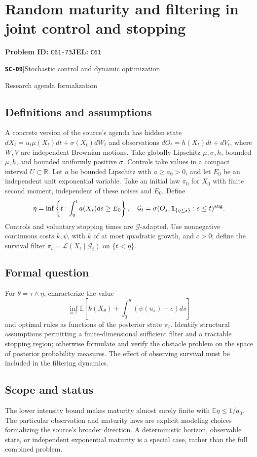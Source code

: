 \documentclass[11pt,a4paper]{article}
\newcommand{\R}{\mathbb R}
\newcommand{\E}{\mathbb E}
\newcommand{\ind}{\mathbf 1}
\newcommand{\entrymeta}[3]{{\sffamily\small\color{muted}\textbf{\texttt{#1}}\quad|\quad #2\par #3\par}}
\begin{document}
\section*{Random maturity and filtering in joint control and stopping}
\textbf{Problem ID:} \texttt{C61-73}\quad \textbf{JEL:} \texttt{C61}\par
\label{problem:OP-0570}
\label{beyond:SC-09}
\entrymeta{SC-09}{Stochastic control and dynamic optimization}{Research agenda formalization}
\subsection*{Definitions and assumptions}
A concrete version of the source's agenda has hidden state
$dX_t=u_t\mu(X_t)dt+\sigma(X_t)dW_t$ and observations
$dO_t=h(X_t)dt+dV_t$, where $W,V$ are independent Brownian motions.
Take globally Lipschitz $\mu,\sigma,h$, bounded $\mu,h$, and bounded
uniformly positive $\sigma$. Controls take values in a compact interval
$U\subset\R$. Let $a$ be bounded Lipschitz with $a\geq a_0>0$, and
let $E_0$ be an independent unit exponential variable. Take an initial
law $\pi_0$ for $X_0$ with finite second moment, independent of these
noises and $E_0$. Define
\[
 \eta=\inf\left\{t:\int_0^t a(X_s)ds\geq E_0\right\},\quad
 \mathcal G_t=\sigma(O_s,\ind_{\{\eta\leq s\}}:s\leq t)^{\rm aug}.
\]
Controls and voluntary stopping times are $\mathcal G$-adapted.
Use nonnegative continuous costs $k,\psi$, with $k$ of at most quadratic
growth, and $c>0$; define the survival filter
$\pi_t=\mathcal L(X_t\mid\mathcal G_t)$ on $\{t<\eta\}$.
\subsection*{Formal question}
For $\theta=\tau\wedge\eta$, characterize the value
\[
 \inf_{u,\tau}\E\left[k(X_\theta)
                 +\int_0^\theta(\psi(u_s)+c)ds\right]
\]
and optimal rules as functions of the posterior state $\pi_t$.
Identify structural assumptions permitting a finite-dimensional sufficient
filter and a tractable stopping region; otherwise formulate and verify
the obstacle problem on the space of posterior probability measures.
The effect of observing survival must be included in the filtering dynamics.
\subsection*{Scope and status}
The lower intensity bound makes maturity almost surely finite with
$\E\eta\leq1/a_0$. The particular observation and maturity laws are
explicit modeling choices formalizing the source's broader direction.
A deterministic horizon, observable state, or independent exponential
maturity is a special case, rather than the full combined problem.
\end{document}
